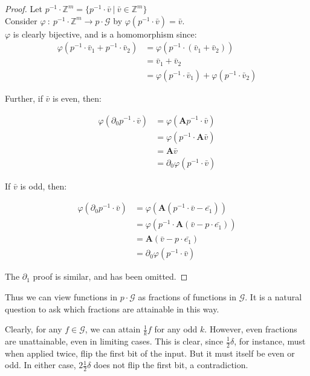 \documentclass[12pt]{article}
\newcommand{\G}{\mathcal{G}}
\newcommand{\Z}{\mathbb{Z}}
\newcommand{\2}{\textbf{2}}
\newcommand{\Am}{\textbf{A}}
\newcommand{\del}{\partial}
\renewcommand{\v}{\bar{v}}
\begin{document}
\begin{proof}
  Let $p^{-1} \cdot \Z^m = \{ p^{-1} \cdot \v~|~\v \in \Z^m \}$\\
  Consider $\varphi~:~p^{-1} \cdot \Z^m \to p \cdot \G$ by
  $\varphi(p^{-1} \cdot \v) = \v$.\\
  $\varphi$ is clearly bijective, and is a homomorphism since:
  \begin{align*}
       \varphi(p^{-1} \cdot \v_1 + p^{-1} \cdot \v_2) 
    &= \varphi(p^{-1} \cdot (\v_1 + \v_2))\\
    &= \v_1 + \v_2\\
    &= \varphi(p^{-1} \cdot \v_1) + \varphi(p^{-1} \cdot \v_2) 
  \end{align*}

  Further, if $\v$ is even, then:

  \begin{align*}
       \varphi(\del_0 p^{-1} \cdot \v)
    &= \varphi(\Am p^{-1} \cdot \v)\\
    &= \varphi(p^{-1} \cdot \Am \v)\\
    &= \Am \v\\
    &= \del_0 \varphi(p^{-1} \cdot \v)
  \end{align*}

  If $\v$ is odd, then: 

  \begin{align*}
       \varphi(\del_0 p^{-1} \cdot \v)
    &= \varphi(\Am (p^{-1} \cdot \v - \bar{e_1}))\\
    &= \varphi(p^{-1} \cdot \Am (\v - p \cdot \bar{e_1}))\\
    &= \Am (\v - p \cdot \bar{e_1})\\
    &= \del_0 \varphi(p^{-1} \cdot \v)
  \end{align*}

  The $\del_1$ proof is similar, and has been omitted.
\end{proof}

Thus we can view functions in $p \cdot \G$ as fractions of functions in $\G$.
It is a natural question to ask which fractions are attainable in this way.

Clearly, for any $f \in \G$, we can attain $\frac{1}{k} f$ for any odd $k$.
However, even fractions are unattainable, even in limiting cases. 
This is clear, since $\frac{1}{2}\delta$, for instance, must 
when applied twice, flip the first bit of the input. But it must itself
be even or odd. In either case, $2 \frac{1}{2} \delta$ does not flip the 
first bit, a contradiction.
\end{document}
